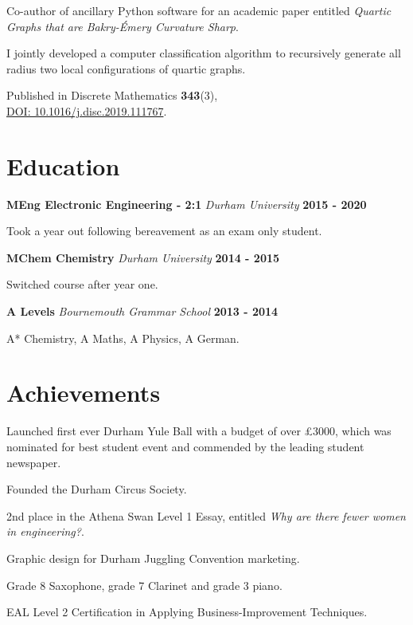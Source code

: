 \documentclass[a4paper, 11pt, hidelinks]{article}
\newcommand{\xp}[3]{
	\vspace{0.25em}
	\textbf{\large#1} \quad \emph{\large#2} \hfill \textbf{\large#3}
}
\begin{document}
\begin{minipage}{0.587\textwidth}
\begin{itemise}
			\item Co-author of ancillary Python software for an academic paper entitled \emph{Quartic Graphs that are Bakry-Émery Curvature Sharp}.
			\item I jointly developed a computer classification algorithm to recursively generate all radius two local configurations of quartic graphs.
			\item Published in Discrete Mathematics \textbf{343}(3),\\ \href{https://arxiv.org/abs/1902.10665}{DOI: 10.1016/j.disc.2019.111767}.
			\hfill
			\href{https://www.francisgurr.com/pages/summer_project/summer_project.html}{\faExternalLink}
		\end{itemise}
		
		\section{Education}
		\xp{MEng Electronic Engineering - 2:1}{Durham University}{2015 - 2020}
		\begin{itemise}
			\item Took a year out following bereavement as an exam only student.
		\end{itemise}
		\xp{MChem Chemistry}{Durham University}{2014 - 2015}
		\begin{itemise}
			\item Switched course after year one.
		\end{itemise}
		\xp{A Levels}{Bournemouth Grammar School}{2013 - 2014}
		\begin{itemise}
			\item A* Chemistry, A Maths, A Physics, A German.
		\end{itemise}
		
		\section{Achievements}
		\begin{itemise}[1em][-0.25em][0em][0em]
			\item Launched first ever Durham Yule Ball with a budget of over £3000, which was nominated for best student event and commended by the leading student newspaper.
			\hfill \href{https://www.palatinate.org.uk/things-you-need-to-do-in-durham-before-graduating/}{\faExternalLink}
			\item Founded the Durham Circus Society.
			\item 2nd place in the Athena Swan Level 1 Essay, entitled \emph{Why are there fewer women in engineering?}.
			\hfill \href{https://www.dur.ac.uk/experience/news/?itemno=27469}{\faExternalLink}
			\item Graphic design for Durham Juggling Convention marketing.
			\item Grade 8 Saxophone, grade 7 Clarinet and grade 3 piano.
			\item EAL Level 2 Certification in Applying Business-Improvement Techniques.
		\end{itemise}
	\end{minipage}
\end{document}
